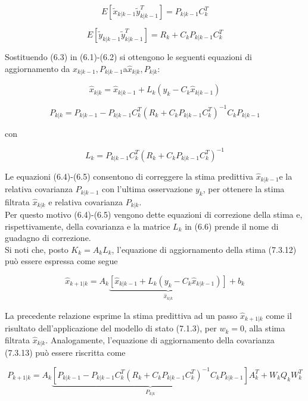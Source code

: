 \begin{equation}
E[\tilde{x}_{k|k-1}\tilde{y}_{k|k-1}^T]=P_{k|k-1}C_k^T
\end{equation}

\[E[\tilde{y}_{k|k-1}\tilde{y}_{k|k-1}^T]=R_k+C_kP_{k|k-1}C_k^T\]

Sostituendo (6.3) in (6.1)-(6.2) si ottengono le seguenti equazioni di aggiornamento da $\hat{x}_{k|k-1},P_{k|k-1}$a$\hat{x}_{k|k},P_{k|k}$:

\begin{equation}
\hat{x}_{k|k}=\hat{x}_{k|k-1}+L_k(y_k-C_k\hat{x}_{k|k-1})
\end{equation}


\begin{equation}
P_{k|k}=P_{k|k-1}-P_{k|k-1}C_k^T(R_k+C_kP_{k|k-1}C_k^T)^{-1}C_kP_{k|k-1}
\end{equation}

con

\begin{equation}
L_k=P_{k|k-1}C_k^T(R_k+C_kP_{k|k-1}C_k^T)^{-1}
\end{equation}

Le equazioni (6.4)-(6.5) consentono di correggere la stima predittiva $\hat{x}_{k|k-1} $e la relativa covarianza $P_{k|k-1} $ con l’ultima osservazione $y_k $, per ottenere la stima filtrata $\hat{x}_{k|k} $ e relativa covarianza $P_{k|k} $.\\
Per questo motivo (6.4)-(6.5) vengono dette equazioni di correzione
della stima e, rispettivamente, della covarianza e la matrice $L_k$ in (6.6) prende il nome di guadagno di correzione.\\
Si noti che, posto $K_k=A_kL_k $, l’equazione di aggiornamento della stima (7.3.12) può essere espressa come segue

\begin{equation}
\hat{x}_{k+1|k}=A_k\underbrace{[\hat{x}_{k|k-1}+L_k(y_k-C_k\hat{x}_{k|k-1})]}_{\hat{x}_{k|k}	}+b_k
\end{equation}

La precedente relazione esprime la stima predittiva ad un passo $\hat{x}_{k+1|k} $ come il risultato dell’applicazione del modello di stato (7.1.3), per $w_k=0 $, alla stima filtrata $\hat{x}_{k|k}$.
Analogamente, l’equazione di aggiornamento della covarianza (7.3.13) può essere riscritta
come

\begin{equation}
P_{k+1|k}=A_k\underbrace{[P_{k|k-1}-P_{k|k-1}C_k^T(R_k+C_kP_{k|k-1}C_k^T)^{-1}C_kP_{k|k-1}]}_{P_{k|k}}A_k^T+W_kQ_kW_k^T
\end{equation}

